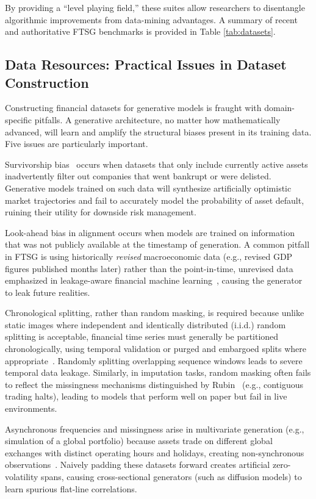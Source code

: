\documentclass[11pt,a4paper]{article}
\begin{document}
By providing a ``level playing field,'' these suites allow researchers to disentangle algorithmic improvements from data-mining advantages. A summary of recent and authoritative FTSG benchmarks is provided in Table \ref{tab:datasets}.

\subsection{Data Resources: Practical Issues in Dataset Construction}
Constructing financial datasets for generative models is fraught with domain-specific pitfalls. A generative architecture, no matter how mathematically advanced, will learn and amplify the structural biases present in its training data. Five issues are particularly important.

Survivorship bias~\citep{brown1992survivorship} occurs when datasets that only include currently active assets inadvertently filter out companies that went bankrupt or were delisted. Generative models trained on such data will synthesize artificially optimistic market trajectories and fail to accurately model the probability of asset default, ruining their utility for downside risk management.

Look-ahead bias in alignment occurs when models are trained on information that was not publicly available at the timestamp of generation. A common pitfall in FTSG is using historically \textit{revised} macroeconomic data (e.g., revised GDP figures published months later) rather than the point-in-time, unrevised data emphasized in leakage-aware financial machine learning~\citep{lopezdeprado2018advances}, causing the generator to leak future realities.

Chronological splitting, rather than random masking, is required because unlike static images where independent and identically distributed (i.i.d.) random splitting is acceptable, financial time series must generally be partitioned chronologically, using temporal validation or purged and embargoed splits where appropriate~\citep{lopezdeprado2018advances}. Randomly splitting overlapping sequence windows leads to severe temporal data leakage. Similarly, in imputation tasks, random masking often fails to reflect the missingness mechanisms distinguished by Rubin~\citep{rubin1976inference} (e.g., contiguous trading halts), leading to models that perform well on paper but fail in live environments.

Asynchronous frequencies and missingness arise in multivariate generation (e.g., simulation of a global portfolio) because assets trade on different global exchanges with distinct operating hours and holidays, creating non-synchronous observations~\citep{hayashi2005covariance}. Naively padding these datasets forward creates artificial zero-volatility spans, causing cross-sectional generators (such as diffusion models) to learn spurious flat-line correlations.
\end{document}
